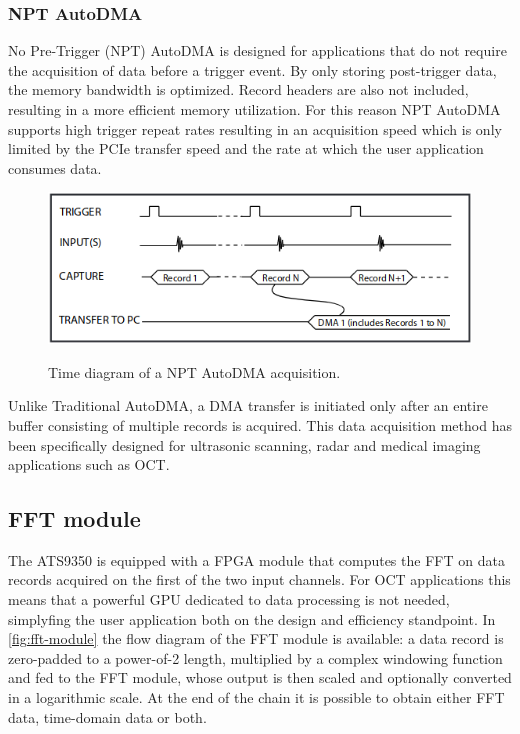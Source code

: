 	\subsubsection{NPT AutoDMA}
	No Pre-Trigger (NPT) AutoDMA is designed for applications that do not require the acquisition of data before a trigger event. By only storing post-trigger data, the memory bandwidth is optimized. Record headers are also not included, resulting in a more efficient memory utilization. For this reason NPT AutoDMA supports high trigger repeat rates resulting in an acquisition speed which is only limited by the PCIe transfer speed and the rate at which the user application consumes data. 
	
	\begin{figure}[bth]
		\myfloatalign
		{\includegraphics[width=.75\linewidth]{gfx/ch3/npt-autodma}}
		\caption{Time diagram of a NPT AutoDMA acquisition.}\label{fig:npt-autodma}
	\end{figure}

	Unlike Traditional AutoDMA, a DMA transfer is initiated only after an entire buffer consisting of multiple records is acquired. This data acquisition method has been specifically designed for ultrasonic scanning, radar and medical imaging applications such as OCT. 
    
    \subsection{FFT module}
    The ATS9350 is equipped with a \ac{FPGA} module that computes the FFT on data records acquired on the first of the two input channels. For OCT applications this means that a powerful GPU dedicated to data processing is not needed, simplyfing the user application both on the design and efficiency standpoint. In \autoref{fig:fft-module} the flow diagram of the FFT module is available: a data record is zero-padded to a power-of-2 length, multiplied by a complex windowing function and fed to the FFT module, whose output is then scaled and optionally converted in a logarithmic scale. At the end of the chain it is possible to obtain either FFT data, time-domain data or both. 
    
